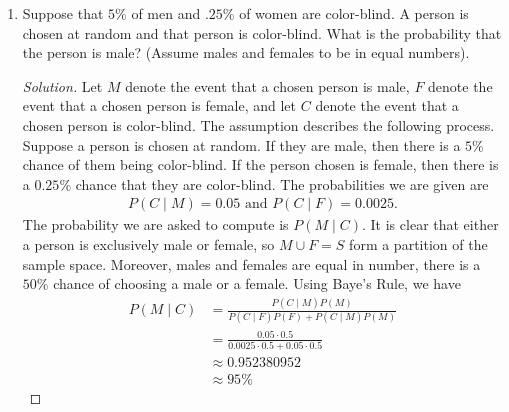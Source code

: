 \documentclass[12pt]{article}
\theoremstyle{definition}
\theoremstyle{plain}
\newenvironment{solution}
  {\begin{proof}[Solution]}
  {\end{proof}}
\renewcommand{\And}{\text{ and }}
\begin{document}
\begin{enumerate}
\begin{solution}
	There are $ N $ candidates in total and each candidate is randomly picked for a given trial. Thus, each candidate is picked for a trial with equal chance. Let $ B $ be the best candidate of the $ N $ candidates. By rule (b), if the $ i $th candidate was hired, then the first $ i-1 $ candidates were removed from the list of employees before going into the trial. If the first candidate was hired, there is a $ \frac{1}{N} $ chance that the candidate was $ B $. Assuming the second candidate was hired, this means that there are now $ N - 1 $ candidates to choose from going into the second trial. Thus, there is a $ \frac{1}{N - 1} $ chance that the candidate was $ B $. Continuing in this manner, if the $ i $th candidate was hired then going into the trial there are $ N - (i - 1) $ candidates left. There is a $ \frac{1}{N - (i - 1)} $ chance that the $ i $th candidate hired was $ B $.
\end{solution}

\item Suppose that $ 5 \% $ of men and $ .25 \% $ of women are color-blind. A person is chosen at random and that person is color-blind. What is the probability that the person is male? (Assume males and females to be in equal numbers).

\begin{solution}
	Let $ M $ denote the event that a chosen person is male, $ F $ denote the event that a chosen person is female, and let $ C $ denote the event that a chosen person is color-blind. The assumption describes the following process. Suppose a person is chosen at random. If they are male, then there is a $ 5 \% $ chance of them being color-blind. If the person chosen is female, then there is a $ 0.25 \% $ chance that they are color-blind. The probabilities we are given are
	\begin{align*}
		P(C \mid M) = 0.05 \And P(C \mid F) = 0.0025.
	\end{align*}
	The probability we are asked to compute is $ P(M \mid C) $. It is clear that either a person is exclusively male or female, so $ M \cup F = S $ form a partition of the sample space. Moreover, males and females are equal in number, there is a $ 50\% $ chance of choosing a male or a female. Using Baye's Rule, we have
	\begin{align*}
		P(M \mid C) &= \frac{ P(C \mid M) P(M) }{ P(C \mid F) P(F) + P(C \mid M) P(M)}\\
		&= \frac{ 0.05 \cdot 0.5 }{0.0025  \cdot 0.5 + 0.05 \cdot 0.5}\\
		&\approx 0.952380952\\
		&\approx 95\%
	\end{align*}
\end{solution}


\end{enumerate}
\end{document}

